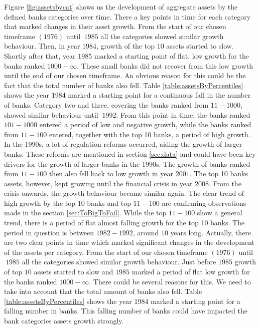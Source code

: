 \documentclass[12pt, a4paper]{article} %
\begin{document}
Figure \ref{fig:assetsbycat} shows us the development of aggregate assets by the defined banks categories over time. 
There a key points in time for each category that marked changes in their asset growth. From the start of our chosen timeframe $(1976)$ until $~1985$ all the categories showed similar growth behaviour. Then, in year $1984$, growth of the top $10$ assets started to slow. Shortly after that, year $1985$ marked a starting point of flat, low growth for the banks ranked $1000-\infty$. These small banks did not recover from this low growth until the end of our chosen timeframe. An obvious reason for this could be the fact that the  total number of banks also fell. Table \ref{table:assetsByPercentiles} shows the year 1984 marked a starting point for a continuous fall in the number of banks. Category two and three, covering the banks ranked from $11-1000$, showed similar behaviour until $~1992$. From this point in time, the banks ranked $101-1000$ entered a period of low and negative growth, while the banks ranked from $11-100$ entered, together with the top 10 banks, a period of high growth. In the 1990s, a lot of regulation reforms occurred, aiding the growth of larger banks. These reforms are mentioned in section \ref{sec:data} and could have been key drivers for the growth of larger banks in the 1990s.
The growth of banks ranked from $11-100$ then also fell back to low growth in year $2001$. The top 10 banks assets, however, kept growing until the financial crisis in year 2008. 
\iffalse
From the crisis onwards, the growth behaviour became similar again.  
The clear trend of high growth by the top 10 banks and top $11-100$ are confirming observations made in the section \ref{sec:ToBigToFail}. While the top $11-100$ show a general trend, there is a period of flat almost falling growth for the top 10 banks. The period in question is between $1982-1992$, around $10$ years long. Actually, there are two clear points in time which marked significant changes in the development of the assets per category. From the start of our chosen timeframe $(1976)$ until $~1985$ all the categories showed similar growth behaviour. Just before $1985$ growth of top $10$ assets started to slow and $1985$ marked a period of flat low growth for the banks ranked $1000-\infty$. There could be several reasons for this. We need to take into account that the total amount of banks also fell. Table \ref{table:assetsByPercentiles} shows the year 1984 marked a starting point for a falling number in banks. This falling number of banks could have impacted the bank categories assets growth strongly. 
\end{document}
